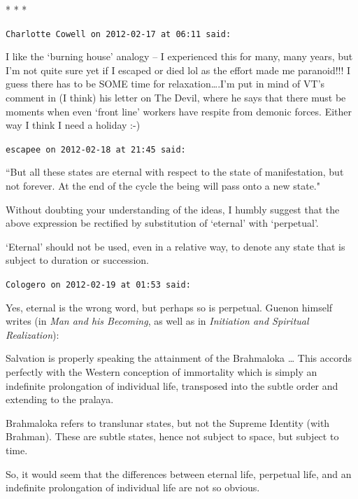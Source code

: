 
\begin{center}* * *\end{center}

\begin{footnotesize}\begin{sffamily}

\texttt{Charlotte Cowell on 2012-02-17 at 06:11 said: }

I like the `burning house' analogy – I experienced this for many, many years, but I'm not quite sure yet if I escaped or died lol as the effort made me paranoid!!! I guess there has to be SOME time for relaxation….I'm put in mind of VT's comment in (I think) his letter on The Devil, where he says that there must be moments when even `front line' workers have respite from demonic forces. Either way I think I need a holiday :-)


\hfill

\texttt{escapee on 2012-02-18 at 21:45 said: }

``But all these states are eternal with respect to the state of manifestation, but not forever. At the end of the cycle the being will pass onto a new state."

Without doubting your understanding of the ideas, I humbly suggest that the above expression be rectified by substitution of `eternal' with `perpetual'. 

`Eternal' should not be used, even in a relative way, to denote any state that is subject to duration or succession.


\hfill

\texttt{Cologero on 2012-02-19 at 01:53 said: }

Yes, eternal is the wrong word, but perhaps so is perpetual. Guenon himself writes (in \textit{Man and his Becoming}, as well as in \textit{Initiation and Spiritual Realization}):

\begin{quotex}\footnotesize
Salvation is properly speaking the attainment of the Brahmaloka … This accords perfectly with the Western conception of immortality which is simply an indefinite prolongation of individual life, transposed into the subtle order and extending to the pralaya.
\end{quotex}

Brahmaloka refers to translunar states, but not the Supreme Identity (with Brahman). These are subtle states, hence not subject to space, but subject to time.

So, it would seem that the differences between eternal life, perpetual life, and an indefinite prolongation of individual life are not so obvious.

\hfill

\end{sffamily}\end{footnotesize}

